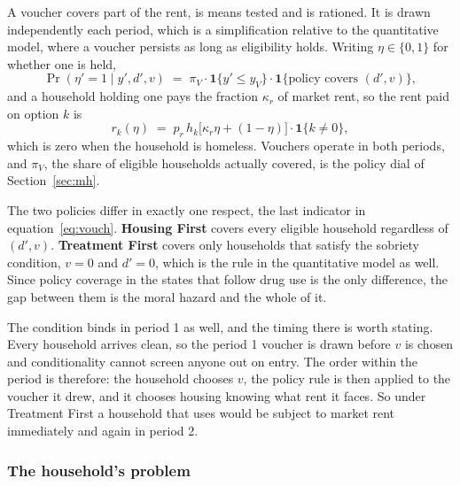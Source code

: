 \documentclass[10pt]{article}
\begin{document}
A voucher covers part of the rent, is means tested and is rationed. It is drawn
independently each period, which is a simplification relative to the
quantitative model, where a voucher persists as long as eligibility holds.
Writing $\eta\in\{0,1\}$ for whether one is held,
\begin{equation}\label{eq:vouch}
\Pr(\eta'=1 \mid y', d', v) \;=\; \pi_V \cdot \mathbf{1}\{y' \le y_V\}
\cdot \mathbf{1}\{\text{policy covers } (d',v)\},
\end{equation}
and a household holding one pays the fraction $\kappa_r$ of market rent, so the
rent paid on option $k$ is
\begin{equation}\label{eq:rent}
r_k(\eta) \;=\; p_r\,h_k\big[\kappa_r \eta + (1-\eta)\big]\cdot
\mathbf{1}\{k \ne 0\},
\end{equation}
which is zero when the household is homeless. Vouchers operate in both periods,
and $\pi_V$, the share of eligible households actually covered, is the policy
dial of Section~\ref{sec:mh}.

The two policies differ in exactly one respect, the last indicator in
equation~\eqref{eq:vouch}. \textbf{Housing First} covers every eligible
household regardless of $(d',v)$. \textbf{Treatment First} covers only
households that satisfy the sobriety condition, $v=0$ and $d'=0$, which is the
rule in the quantitative model as well. Since policy coverage in the states
that follow drug use is the only difference, the gap between them is the moral
hazard and the whole of it.

The condition binds in period 1 as well, and the timing there is worth stating.
Every household arrives clean, so the period 1 voucher is drawn before $v$ is
chosen and conditionality cannot screen anyone out on entry. The order
within the period is therefore: the household chooses $v$, the policy rule is
then applied to the voucher it drew, and it chooses housing knowing what rent it
faces. So under Treatment First a household that uses would be subject to
market rent immediately and again in period 2.

\subsubsection{The household's problem}\label{sec:problem}
\end{document}
